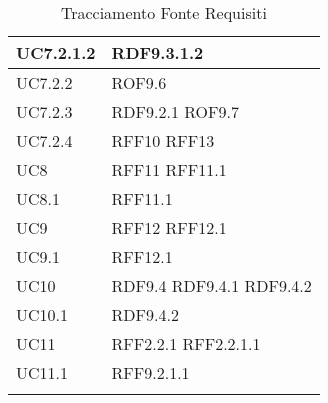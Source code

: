 \documentclass[../AnalisideiRequisiti.tex]{subfiles}
\begin{document}
\begin{longtable}{| p{4cm} | p{4cm} |}
		\hline
		\newline UC7.2.1.2 &  \newline RDF9.3.1.2 \\[1em]
		\hline
		\newline UC7.2.2 &  \newline ROF9.6 \\[1em]
		\hline
		\newline UC7.2.3 &  \newline RDF9.2.1 \newline ROF9.7 \\[1em]
		\hline
		\newline UC7.2.4 &  \newline RFF10 \newline RFF13 \\[1em]
		\hline
		\newline UC8 &  \newline RFF11 \newline RFF11.1 \\[1em]
		\hline
		
		\newline UC8.1 &  \newline RFF11.1 \\[1em]
		\hline
		
		\newline UC9 &  \newline RFF12 \newline RFF12.1 \\[1em]
		\hline
		\newline UC9.1 &  \newline RFF12.1 \\[1em]
		\hline
		\newline UC10 &  \newline RDF9.4 \newline RDF9.4.1 \newline RDF9.4.2 \\[1em]
		\hline
		\newline UC10.1 &  \newline RDF9.4.2 \\[1em]
		\hline
		\newline UC11 &  \newline RFF2.2.1 \newline RFF2.2.1.1\\[1em]
		\hline
		\newline UC11.1 &  \newline RFF9.2.1.1 \\[1em]
		\hline
		
		\caption{Tracciamento Fonte Requisiti}
	\end{longtable}
\newpage
\end{document}
